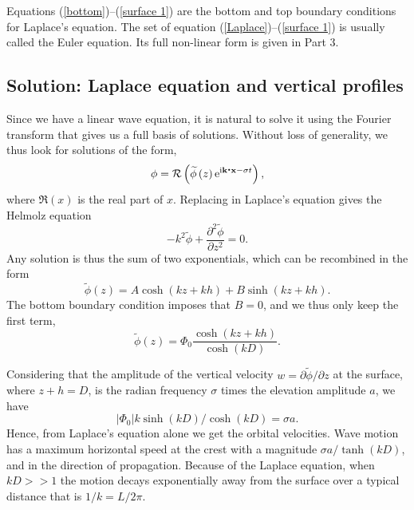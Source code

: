 Equations (\ref{bottom})--(\ref{surface 1}) are the bottom and top boundary conditions for Laplace's equation. The 
set of equation  (\ref{Laplace})--(\ref{surface 1}) is
usually called the Euler equation. Its full non-linear form is given in Part 3. 
 
\subsection{Solution: Laplace equation and vertical profiles}
Since we have a linear wave equation, it is natural to solve it 
using the Fourier transform that gives us a full basis of solutions. Without loss of generality, 
we thus look for solutions of the form, 
\begin{equation}
    \phi={\cal R} \left(\widetilde{\phi}\left(z\right)
     \mathrm{e}^{\mathrm{i}{\mathbf k}\mbox{\boldmath $\cdot$}{\mathbf x} - \sigma t} \right),
    \label{phi1}
\end{equation}
where $\Re(x)$ is the real part of $x$. Replacing in Laplace's equation gives the Helmolz equation 
\begin{equation}
    -k^2 \widetilde{\phi}+\frac{\partial^2 \widetilde{\phi}}{\partial z^2}=0.
    \label{Helmholz}
\end{equation}
Any solution is thus the sum of two exponentials, which can be recombined in the form 
\begin{equation}
    \widetilde{\phi}(z)=A \cosh\left(kz+kh \right)
        + B \sinh\left(kz+kh \right).
\end{equation}
The bottom boundary condition imposes that $B=0$, and we thus only keep the first term,
\begin{equation}
    \widetilde{\phi}\left(z\right)=\Phi_0
    \frac{\cosh\left(kz+kh\right)}{\cosh\left(kD\right)}.
    \label{cosh}
\end{equation}

Considering that the amplitude of the vertical velocity $w=\partial \widetilde{\phi} / \partial z$ at the surface, where $z+h=D$,  is the radian frequency $\sigma$ times the elevation amplitude $a$, 
we have 
\begin{equation}
    | \Phi_0 |   k \sinh (kD) / \cosh (kD) = \sigma a.
\end{equation}
Hence, from Laplace's equation alone we get the orbital velocities. Wave motion has a maximum horizontal speed at the crest with a magnitude  $\sigma a / \tanh(kD)$, and in the direction 
of propagation. Because of the Laplace equation, when $kD >> 1$ the motion decays exponentially away from the surface over a typical distance that is $1/k=L/2\pi$.

